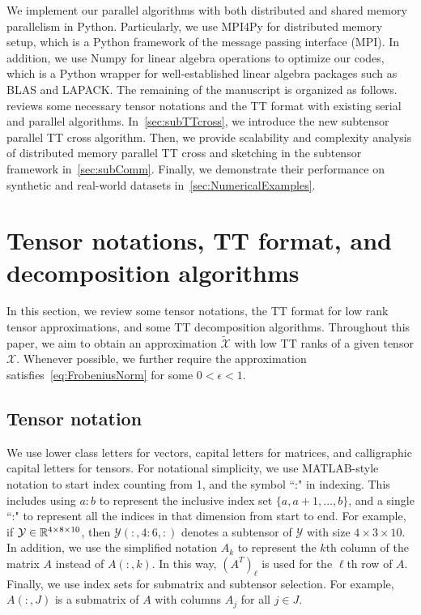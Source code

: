 \documentclass[11pt,a4paper,review]{siamart220329}
\begin{document}
We implement our parallel algorithms with both distributed and shared memory parallelism in Python. Particularly, we use MPI4Py for distributed memory setup, which is a Python framework of the message passing interface (MPI). In addition, we use Numpy for linear algebra operations to optimize our codes, which is a Python wrapper for well-established linear algebra packages such as BLAS and LAPACK. The remaining of the manuscript is organized as follows.~ reviews some necessary tensor notations and the TT format with existing serial and parallel algorithms. In~\cref{sec:subTTcross}, we introduce the new subtensor parallel TT cross algorithm. Then, we provide scalability and complexity analysis of distributed memory parallel TT cross and sketching in the subtensor framework in~\cref{sec:subComm}. Finally, we demonstrate their performance on synthetic and real-world datasets in~\cref{sec:NumericalExamples}. 



\section{Tensor notations, TT format, and decomposition algorithms} \label{sec:background}
In this section, we review some tensor notations, the TT format for low rank tensor approximations, and some TT decomposition algorithms. Throughout this paper, we aim to obtain an approximation $\tilde{\mathcal{X}}$ with low TT ranks of a given tensor $\mathcal{X}$. Whenever possible, we further require the approximation satisfies~\cref{eq:FrobeniusNorm} for some $0 < \epsilon < 1$.

\subsection{Tensor notation} \label{sec:notation}
We use lower class letters for vectors, capital letters for matrices, and calligraphic capital letters for tensors. For notational simplicity, we use MATLAB-style notation to start index counting from 1, and the symbol ``:" in indexing. This includes using $a\!:\!b$ to represent the inclusive index set $\{a,a+1,\ldots,b\}$, and a single ``:" to represent all the indices in that dimension from start to end. For example, if $\mathcal{Y} \in \mathbb{R}^{4 \times 8 \times 10}$, then $\mathcal{Y}(:,4\!:\!6,:)$ denotes a subtensor of $\mathcal{Y}$ with size $4 \times 3 \times 10$. In addition, we use the simplified notation $A_k$ to represent the $k$th column of the matrix $A$ instead of $A(:,k)$. In this way, $(A^T)_\ell$ is used for the $\ell$th row of $A$. Finally, we use index sets for submatrix and subtensor selection. For example, $A(:,J)$ is a submatrix of $A$ with columns $A_j$ for all $j \in J$.
\end{document}
